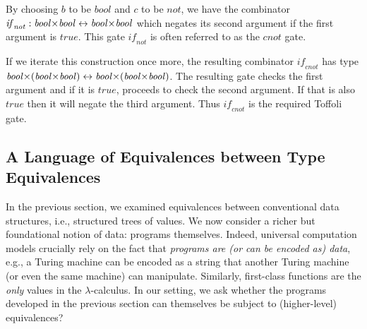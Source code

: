 \begin{center}
\scalebox{1.5}{
}
\end{center}


By choosing \ensuremath{b} to be \ensuremath{\mathit{bool}} and \ensuremath{c} to be \ensuremath{\mathit{not}}, we have the
combinator \ensuremath{\mathit{if}_{\mathit{not}} : \mathit{bool} {\prodtype}  \mathit{bool}\leftrightarrow \mathit{bool} {\prodtype}  \mathit{bool}} which negates its
second argument if the first argument is \ensuremath{\mathit{true}}. This gate
\ensuremath{\mathit{if}_{\mathit{not}}} is often referred to as the \ensuremath{\mathit{cnot}} gate\cite{Toffoli:1980}.

If we iterate this construction once more, the resulting combinator
\ensuremath{\mathit{if}_{\mathit{cnot}}} has type \ensuremath{\mathit{bool} {\prodtype}  (\mathit{bool} {\prodtype}  \mathit{bool})\leftrightarrow \mathit{bool} {\prodtype}  (\mathit{bool} {\prodtype}  \mathit{bool})}. The
resulting gate checks the first argument and if it is \ensuremath{\mathit{true}},
proceeds to check the second argument. If that is also \ensuremath{\mathit{true}} then
it will negate the third argument. Thus \ensuremath{\mathit{if}_{\mathit{cnot}}} is the required
Toffoli gate.

\begin{center}
\scalebox{1.6}{
}
\end{center}

\subsection{A Language of Equivalences between Type Equivalences}
\label{langeqeq}

In the previous section, we examined equivalences between conventional data structures, i.e., structured trees of
values. We now consider a richer but foundational notion of data: programs themselves. Indeed, universal computation
models crucially rely on the fact that \emph{programs are (or can be encoded as) data}, e.g., a Turing machine can be
encoded as a string that another Turing machine (or even the same machine) can manipulate. Similarly, first-class
functions are the \emph{only} values in the $\lambda$-calculus.  In our setting, we ask whether the programs developed
in the previous section can themselves be subject to (higher-level) equivalences?


